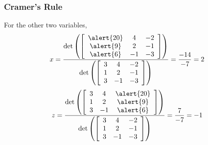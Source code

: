 \documentclass[xcolor=dvipsnames]{beamer}
\begin{document}
\begin{frame}
  \frametitle{Cramer's Rule}
  For the other two variables,
  \begin{equation}
    \label{eq:sheethei}
    x=\frac{\det\left(\left[
        \begin{array}{ccc}
        \alert{20} & 4 & -2 \\
        \alert{9} & 2 & -1 \\
        \alert{6} & -1 & -3
        \end{array}
\right]\right)}{\det\left(\left[
      \begin{array}{ccc}
        3 & 4 & -2 \\
        1 & 2 & -1 \\
        3 & -1 & -3
      \end{array}\right]\right)}=\frac{-14}{-7}=2
  \end{equation}
  \begin{equation}
    \label{eq:ijohmahv}
    z=\frac{\det\left(\left[
        \begin{array}{ccc}
        3 & 4 & \alert{20} \\
        1 & 2 & \alert{9} \\
        3 & -1 & \alert{6}
        \end{array}
\right]\right)}{\det\left(\left[
      \begin{array}{ccc}
        3 & 4 & -2 \\
        1 & 2 & -1 \\
        3 & -1 & -3
      \end{array}\right]\right)}=\frac{7}{-7}=-1
  \end{equation}
\end{frame}
\end{document}
